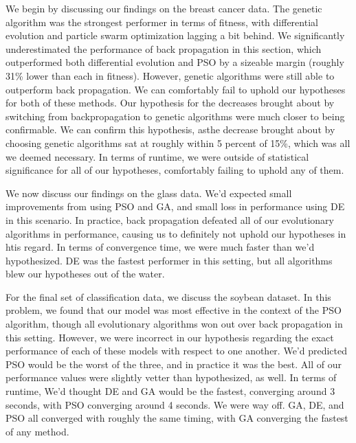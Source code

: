 \documentclass[twoside,11pt]{article}
\begin{document}
We begin by discussing our findings on the breast cancer data. The genetic algorithm was the
strongest performer in terms of fitness, with differential evolution and particle swarm 
optimization lagging a bit behind. We significantly underestimated the performance of back propagation in this section, which outperformed both differential evolution and PSO by a sizeable
margin (roughly 31\% lower than each in fitness). However, genetic algorithms were still able to outperform back propagation. We can comfortably fail to uphold our hypotheses for both of 
these methods. Our hypothesis for the decreases brought about by switching from backpropagation
to genetic algorithms were much closer to being confirmable. We can confirm this hypothesis, asthe decrease brought about by choosing genetic algorithms sat at roughly within 5 percent of 
15\%, which was all we deemed necessary. In terms of runtime, we were outside of statistical
significance for all of our hypotheses, comfortably failing to uphold any of them.

We now discuss our findings on the glass data. We'd expected small improvements from using
PSO and GA, and small loss in performance using DE in this scenario. In practice, back propagation defeated all of our evolutionary algorithms in performance, causing us to definitely not uphold our hypotheses in htis regard. In terms of convergence time, we were much faster than
we'd hypothesized. DE was the fastest performer in this setting, but all algorithms blew our 
hypotheses out of the water.

For the final set of classification data, we discuss the soybean dataset. In this problem,
we found that our model was most effective in the context of the PSO algorithm, though
all evolutionary algorithms won out over back propagation in this setting. However, we were
incorrect in our hypothesis regarding the exact performance of each of these models with
respect to one another. We'd predicted PSO would be the worst of the three, and in practice
it was the best. All of our performance values were slightly vetter than hypothesized, as well.
In terms of runtime, We'd thought DE and GA would be the fastest, converging around 3 seconds,
with PSO converging around 4 seconds. We were way off. GA, DE, and PSO all converged
with roughly the same timing, with GA converging the fastest of any method.
\end{document}
